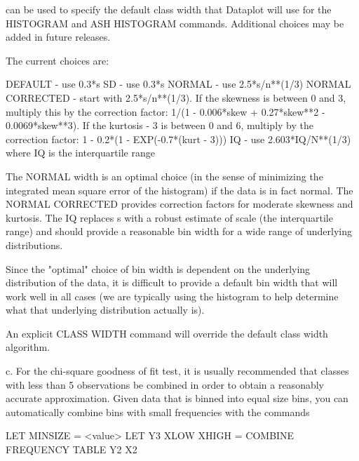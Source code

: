 {       can be used to specify the default class width that Dataplot
       will use for the HISTOGRAM and ASH HISTOGRAM commands.
       Additional choices may be added in future releases.

       The current choices are:

           DEFAULT           - use 0.3*s
           SD                - use 0.3*s
           NORMAL            - use 2.5*s/n**(1/3)
           NORMAL CORRECTED  - start with 2.5*s/n**(1/3).  If the
                               skewness is between 0 and 3, multiply
                               this by the correction factor:
                               1/(1 - 0.006*skew + 0.27*skew**2 -
                               0.0069*skew**3).
                               If the kurtosis - 3 is between 0 and 6,
                               multiply by the correction factor:
                               1 - 0.2*(1 - EXP(-0.7*(kurt - 3)))
           IQ                - use 2.603*IQ/N**(1/3) where IQ is the
                               interquartile range

       The NORMAL width is an optimal choice (in the sense of
       minimizing the integrated mean square error of the histogram)
       if the data is in fact normal.  The NORMAL CORRECTED provides
       correction factors for moderate skewness and kurtosis.  The
       IQ replaces s with a robust estimate of scale (the
       interquartile range) and should provide a reasonable bin width
       for a wide range of underlying distributions.

       Since the "optimal" choice of bin width is dependent on
       the underlying distribution of the data, it is difficult
       to provide a default bin width that will work well in all
       cases (we are typically using the histogram to help determine
       what that underlying distribution actually is).

       An explicit CLASS WIDTH command will override the default
       class width algorithm.

    c. For the chi-square goodness of fit test, it is usually
       recommended that classes with less than 5 observations be
       combined in order to obtain a reasonably accurate
       approximation.  Given data that is binned into equal size
       bins, you can automatically combine bins with small
       frequencies with the commands

           LET MINSIZE = <value>
           LET Y3 XLOW XHIGH = COMBINE FREQUENCY TABLE Y2 X2

}
